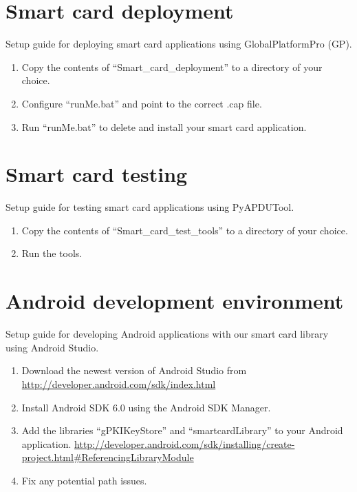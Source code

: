 \section{Smart card deployment}
Setup guide for deploying smart card applications using GlobalPlatformPro (GP).
\begin{enumerate}
  \item Copy the contents of ``Smart\_card\_deployment'' to a directory of your choice.
  \item Configure ``runMe.bat'' and point to the correct .cap file.
  \item Run ``runMe.bat'' to delete and install your smart card application.
\end{enumerate}

\section{Smart card testing}
Setup guide for testing smart card applications using PyAPDUTool.
\begin{enumerate}
  \item Copy the contents of ``Smart\_card\_test\_tools'' to a directory of your choice.
  \item Run the tools.
\end{enumerate}

\section{Android development environment}
Setup guide for developing Android applications with our smart card library using Android Studio.
\begin{enumerate}
  \item Download the newest version of Android Studio from \sloppy \url{http://developer.android.com/sdk/index.html}
  \item Install Android SDK 6.0 using the Android SDK Manager.
  \item Add the libraries ``gPKIKeyStore'' and ``smartcardLibrary'' to your Android application. \sloppy \url{http://developer.android.com/sdk/installing/create-project.html#ReferencingLibraryModule}
  \item Fix any potential path issues.
\end{enumerate}
